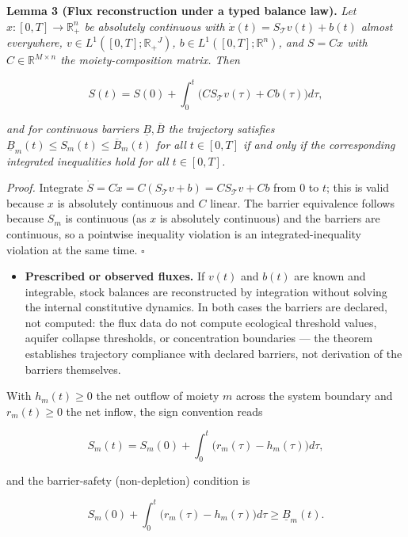 \documentclass[11pt]{article}
\begin{document}
\textbf{Lemma 3 (Flux reconstruction under a typed balance law).} \emph{Let \(x : [0,T] \to \mathbb{R}_+^n\) be absolutely continuous with \(\dot x(t) =\allowbreak{} S_{\mathcal{T}} v(t) +\allowbreak{} b(t)\) almost everywhere, \(v \in L^1([0,\allowbreak{}T]; \mathbb{R}_+\allowbreak{}^J)\), \(b \in L^1([0,\allowbreak{}T]; \mathbb{R}^n)\), and \(S = Cx\) with \(C \in \mathbb{R}^{M \times n}\) the moiety-composition matrix. Then} 

$$S(t) = S(0) + \int_0^t \bigl( C S_{\mathcal{T}} v(\tau) + Cb(\tau) \bigr) d\tau,$$

 \emph{and for continuous barriers \(\underline{B}, \overline{B}\) the trajectory satisfies \(\underline{B}_m(t) \le S_m(t) \le \overline{B}_m(t)\) for all \(t \in [0,T]\) if and only if the corresponding integrated inequalities hold for all \(t \in [0,T]\).}

\emph{Proof.} Integrate \(\dot S =\allowbreak{} C\dot x =\allowbreak{} C(S_{\mathcal{T}} v +\allowbreak{} b) =\allowbreak{} C S_{\mathcal{T}} v +\allowbreak{} Cb\) from \(0\) to \(t\); this is valid because \(x\) is absolutely continuous and \(C\) linear. The barrier equivalence follows because \(S_m\) is continuous (as \(x\) is absolutely continuous) and the barriers are continuous, so a pointwise inequality violation is an integrated-inequality violation at the same time. \(\square\)

\begin{itemize}\setlength{\itemsep}{2pt}
\item \textbf{Prescribed or observed fluxes.} If \(v(t)\) and \(b(t)\) are known and integrable, stock balances are reconstructed by integration without solving the internal constitutive dynamics. In both cases the barriers are declared, not computed: the flux data do not compute ecological threshold values, aquifer collapse thresholds, or concentration boundaries --- the theorem establishes trajectory compliance with declared barriers, not derivation of the barriers themselves.
\end{itemize}

With \(h_m(t) \ge 0\) the net outflow of moiety \(m\) across the system boundary and \(r_m(t) \ge 0\) the net inflow, the sign convention reads 

$$S_m(t) = S_m(0) + \int_0^t \bigl( r_m(\tau) - h_m(\tau) \bigr) d\tau,$$

 and the barrier-safety (non-depletion) condition is 

$$S_m(0) + \int_0^t \bigl( r_m(\tau) - h_m(\tau) \bigr) d\tau \ge \underline{B}_m(t).$$
\end{document}
